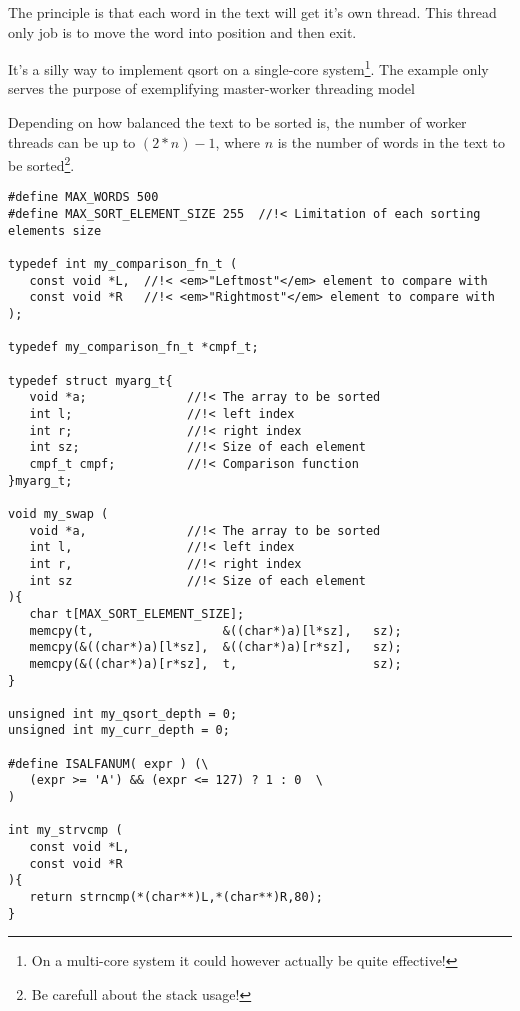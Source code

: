 The principle is that each word in the text will get it's own thread. This thread only job is to move the word into position and then exit.

It's a silly way to implement qsort on a single-core system\footnote{On a multi-core system it could however actually be quite effective!}. The example only serves the purpose of exemplifying master-worker threading model

Depending on how balanced the text to be sorted is, the number of worker threads can be up to $(2 * n) - 1$, where $n$ is the number of words in the text to be sorted\footnote{Be carefull about the stack usage!}.

\begin{table}[!hbp]
\begin{verbatim}
#define MAX_WORDS 500
#define MAX_SORT_ELEMENT_SIZE 255  //!< Limitation of each sorting elements size

typedef int my_comparison_fn_t (  
   const void *L,  //!< <em>"Leftmost"</em> element to compare with
   const void *R   //!< <em>"Rightmost"</em> element to compare with
);

typedef my_comparison_fn_t *cmpf_t;

typedef struct myarg_t{
   void *a;              //!< The array to be sorted
   int l;                //!< left index
   int r;                //!< right index
   int sz;               //!< Size of each element
   cmpf_t cmpf;          //!< Comparison function 
}myarg_t;

void my_swap (
   void *a,              //!< The array to be sorted
   int l,                //!< left index
   int r,                //!< right index
   int sz                //!< Size of each element   
){
   char t[MAX_SORT_ELEMENT_SIZE];
   memcpy(t,                  &((char*)a)[l*sz],   sz);
   memcpy(&((char*)a)[l*sz],  &((char*)a)[r*sz],   sz);
   memcpy(&((char*)a)[r*sz],  t,                   sz);
}

unsigned int my_qsort_depth = 0; 
unsigned int my_curr_depth = 0;  

#define ISALFANUM( expr ) (\
   (expr >= 'A') && (expr <= 127) ? 1 : 0  \
)

int my_strvcmp (  
   const void *L,
   const void *R 
){
   return strncmp(*(char**)L,*(char**)R,80);   
}
\end{verbatim}
\caption{Structures and data.\label{ccsort_structs}}
\end{table}

